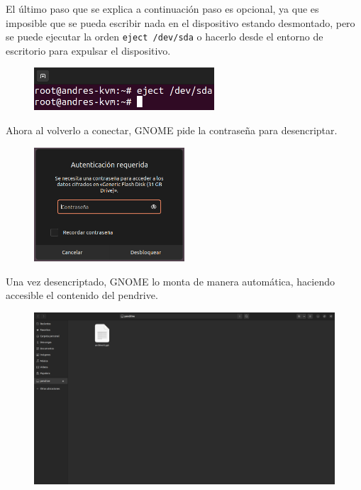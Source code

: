 \documentclass{article}
\begin{document}
\bigskip

El último paso que se explica a continuación paso es opcional, ya que es imposible que se pueda escribir nada en el dispositivo estando desmontado, pero se puede ejecutar la orden \verb|eject /dev/sda| o hacerlo desde el entorno de escritorio para expulsar el dispositivo.

\begin{figure}[H]
    \centering
    \includegraphics[width=0.6\textwidth]{imagenes/Captura desde 2022-10-30 11-03-16.png}
\end{figure}

\newpage

Ahora al volverlo a conectar, GNOME pide la contraseña para desencriptar.

\begin{figure}[H]
    \centering
    \includegraphics[width=0.5\textwidth]{imagenes/Captura desde 2022-10-30 11-04-17.png}
\end{figure}

\bigskip

Una vez desencriptado, GNOME lo monta de manera automática, haciendo accesible el contenido del pendrive.

\begin{figure}[H]
    \includegraphics[width=\textwidth]{imagenes/Captura desde 2022-10-30 11-05-16.png}
\end{figure}
\end{document}
